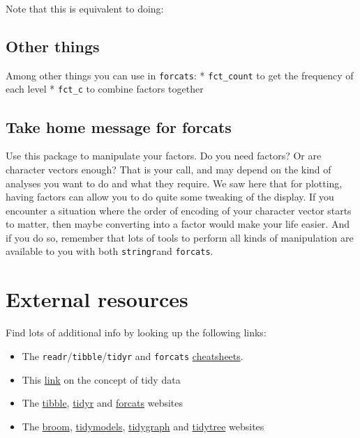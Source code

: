 \documentclass[]{book}
\newenvironment{Shaded}{}{}
\newcommand{\KeywordTok}[1]{\textcolor[rgb]{0.00,0.44,0.13}{\textbf{#1}}}
\newcommand{\NormalTok}[1]{#1}
\newcommand{\OperatorTok}[1]{\textcolor[rgb]{0.40,0.40,0.40}{#1}}
\newcommand{\StringTok}[1]{\textcolor[rgb]{0.25,0.44,0.63}{#1}}
\providecommand{\tightlist}{%
  \setlength{\itemsep}{0pt}\setlength{\parskip}{0pt}}
\begin{document}
Note that this is equivalent to doing:

\begin{Shaded}
\end{Shaded}

\hypertarget{other-things}{%
\subsection{Other things}\label{other-things}}

Among other things you can use in \texttt{forcats}:
* \texttt{fct\_count} to get the frequency of each level
* \texttt{fct\_c} to combine factors together

\hypertarget{take-home-message-for-forcats}{%
\subsection{Take home message for forcats}\label{take-home-message-for-forcats}}

Use this package to manipulate your factors. Do you need factors? Or are character vectors enough? That is your call, and may depend on the kind of analyses you want to do and what they require. We saw here that for plotting, having factors can allow you to do quite some tweaking of the display. If you encounter a situation where the order of encoding of your character vector starts to matter, then maybe converting into a factor would make your life easier. And if you do so, remember that lots of tools to perform all kinds of manipulation are available to you with both \texttt{stringr}and \texttt{forcats}.

\hypertarget{external-resources}{%
\section{External resources}\label{external-resources}}

Find lots of additional info by looking up the following links:

\begin{itemize}
\tightlist
\item
  The \texttt{readr}/\texttt{tibble}/\texttt{tidyr} and \texttt{forcats} \href{https://rstudio.com/resources/cheatsheets/}{cheatsheets}.
\item
  This \href{https://tidyr.tidyverse.org/articles/tidy-data.html}{link} on the concept of tidy data
\item
  The \href{https://tibble.tidyverse.org/}{tibble}, \href{https://tidyr.tidyverse.org/}{tidyr} and \href{https://forcats.tidyverse.org/}{forcats} websites
\item
  The \href{https://broom.tidymodels.org/}{broom}, \href{https://www.tidymodels.org/}{tidymodels}, \href{https://www.data-imaginist.com/2017/introducing-tidygraph/}{tidygraph} and \href{https://yulab-smu.github.io/treedata-book/}{tidytree} websites
\end{itemize}
\end{document}
